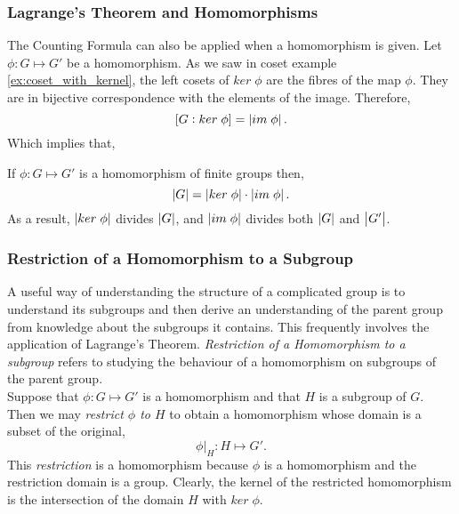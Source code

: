 \documentclass[MathsNotesBase.tex]{subfiles}
\begin{document}
{	\subsubsection{Lagrange's Theorem and Homomorphisms}
	The Counting Formula can also be applied when a homomorphism is given. Let $\phi : G \longmapsto G'$ be a homomorphism. As we saw in coset example \ref{ex:coset_with_kernel}, the left cosets of $ker \; \phi$ are the fibres of the map $\phi$. They are in bijective correspondence with the elements of the image. Therefore,
	\[ [G : ker \; \phi] = \left\lvert im \; \phi\right\rvert. \]
	Which implies that,
	\begin{corollary}
		\label{coro:order_of_image_divides_both_order_of_domain_and_codomain}
		If $\phi : G \longmapsto G'$ is a homomorphism of finite groups then,
		\[ \left\lvert G\right\rvert = \left\lvert ker \; \phi\right\rvert \cdot \left\lvert im \; \phi\right\rvert. \]
		As a result, $\left\lvert ker \; \phi\right\rvert$ divides $\left\lvert G\right\rvert$, and $\left\lvert im \; \phi\right\rvert$ divides both $\left\lvert G\right\rvert$ and $\left\lvert G'\right\rvert$.
	\end{corollary}

	\bigskip
	\subsubsection{Restriction of a Homomorphism to a Subgroup}
	A useful way of understanding the structure of a complicated group is to understand its subgroups and then derive an understanding of the parent group from knowledge about the subgroups it contains. This frequently involves the application of Lagrange's Theorem. \textit{Restriction of a Homomorphism to a subgroup} refers to studying the behaviour of a homomorphism on subgroups of the parent group.\\
	Suppose that ${ \phi: G \longmapsto G' }$ is a homomorphism and that $H$ is a subgroup of $G$. Then we may \textit{restrict $\phi$ to $H$} to obtain a homomorphism whose domain is a subset of the original,
	\[ \phi \vert_H : H \longmapsto G'. \]
	This \textit{restriction} is a homomorphism because $\phi$ is a homomorphism and the restriction domain is a group. Clearly, the kernel of the restricted homomorphism is the intersection of the domain $H$ with ${ ker\;\phi }$.
	
	\smallskip
}
\end{document}
